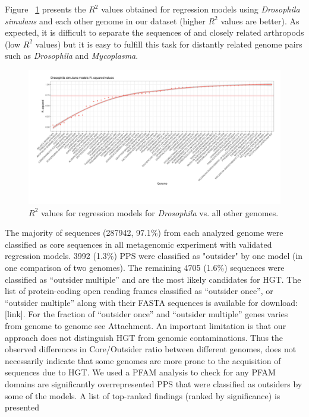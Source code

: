 Figure ~\ref{fig:rsquared_curve} presents the $R^2$ values obtained for
regression models using \textit{Drosophila simulans} and each other genome in
our dataset (higher $R^2$ values are better). As expected, it is difficult to
separate the sequences of and closely related arthropods (low $R^2$ values) but
it is easy to fulfill this task for distantly related genome pairs such as
\textit{Drosophila} and \textit{Mycoplasma}.
\begin{center}
\begin{figure}
\includegraphics[width=12cm]{figures/rsq_drosoph_bootstrapped.pdf}
\caption{$R^2$ values for regression models for \textit{Drosophila} vs. all
other genomes.}
\label{fig:rsquared_curve}
\end{figure}
\end{center}
The majority of sequences (287942, 97.1\%) from each analyzed genome were
classified as core sequences in all metagenomic experiment with validated
regression models. 3992 (1.3\%) PPS were classified as "outsider" by one model
(in one comparison of two genomes). The remaining 4705 (1.6\%) sequences were
classified as “outsider multiple” and are the most likely candidates for HGT.
The list of protein-coding open reading frames classified as “outsider once”,
or “outsider multiple” along with their FASTA sequences is available for
download: [link]. For the fraction of “outsider once” and “outsider multiple”
genes varies from genome to genome see Attachment. An important limitation is
that our approach does not distinguish HGT from genomic contaminations. Thus
the observed differences in Core/Outsider ratio between different genomes, does
not necessarily indicate that some genomes are more prone to the acquisition of
sequences due to HGT. We used a PFAM analysis to check for any PFAM domains are
significantly overrepresented PPS that were classified as outsiders by some of
the models. A list of top-ranked findings (ranked by significance) is presented
